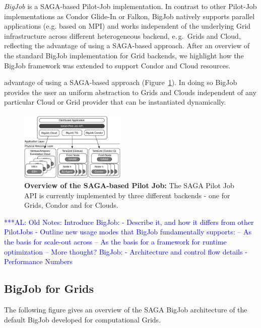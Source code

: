 \documentclass[conference,final]{IEEEtran}
\newcommand{\alnote}[1]{ {\textcolor{blue} { ***AL: #1 }}}
\newcommand{\alnote}[1]{}
\begin{document}
\emph{BigJob} is a SAGA-based Pilot-Job implementation. In contrast to other
Pilot-Job implementations as Condor Glide-In or Falkon, BigJob
natively supports parallel applications (e.g. based on MPI) and works
independent of the underlying Grid infrastructure across different
heterogeneous backend, e.\,g.\ Grids and Cloud, reflecting the
advantage of using a SAGA-based approach. After an overview of the
standard BigJob implementation for Grid backends, we highlight how the
BigJob framework was extended to support Condor and Cloud resources.

advantage of using a SAGA-based approach (Figure~\ref{fig:figures_distributed_pilot_job}).
In doing so BigJob provides the user an uniform abstraction to Grids and Clouds
independent of any particular Cloud or Grid provider that can be
instantiated dynamically.
\begin{figure}[htbp]
    \centering
        \includegraphics[width=0.45\textwidth]{figures/distributed_pilot_job.pdf}
    \caption{\textbf{Overview of the SAGA-based Pilot Job:} The SAGA Pilot Job API is
    currently implemented by three different backends - one for Grids, Condor and 
    for Clouds.}
    \label{fig:figures_distributed_pilot_job}
\end{figure}

\alnote{Old Notes: 
Introduce BigJob:
 - Describe it, and how it differs from other PilotJobs
 - Outline new usage modes that BigJob fundamentally supports:
    -- As the basis for scale-out across
    -- As the basis for a framework for runtime optimization
    -- More thought?
BigJob:
 - Architecture and control flow details
 - Performance Numbers}

\subsection{BigJob for Grids}

The following figure gives an overview of the SAGA BigJob architecture of the default BigJob
developed for computational Grids.
\end{document}
